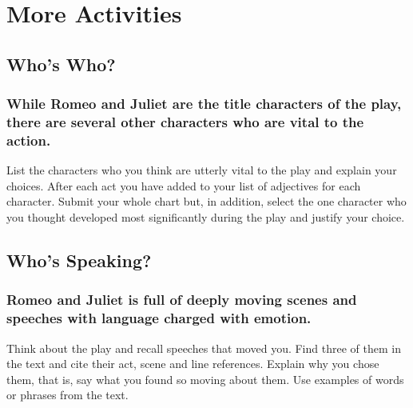 \documentclass{article}
\begin{document}
\section{More Activities}
\subsection{Who's Who?}
\subsubsection{While Romeo and Juliet are the title characters of the play, there are several other characters who are vital to the action.}
\begin{outline}
\1 List the characters who you think are utterly vital to the play and explain your choices.
\2
\1 After each act you have added to your list of adjectives for each character. Submit your whole chart but, in addition, select the one character who you thought developed most significantly during the play and justify your choice.
\2
\end{outline}
\subsection{Who's Speaking?}
\subsubsection{Romeo and Juliet is full of deeply moving scenes and speeches with language charged with emotion.}
\begin{outline}
\1 Think about the play and recall speeches that moved you.
\2
\1 Find three of them in the text and cite their act, scene and line references.
\2
\1 Explain why you chose them, that is, say what you found so moving about them. Use examples of words or phrases from the text.
\2
\end{outline}
\end{document}
